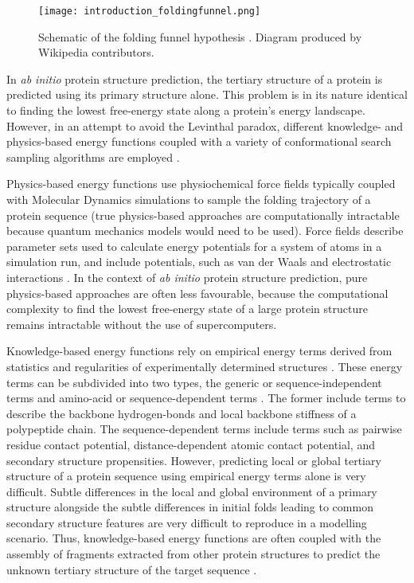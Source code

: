 \begin{figure}[H]
    \centering
    \texttt{[image: introduction\_foldingfunnel.png]}
    \caption[Schematic of the folding funnel hypothesis]{Schematic of the folding funnel hypothesis \cite{Leopold1992-yf}. Diagram produced by Wikipedia contributors.}
    \label{fig:introduction_foldingfunnel}
\end{figure}

In \textit{ab initio} protein structure prediction, the tertiary structure of a protein is predicted using its primary structure alone. This problem is in its nature identical to finding the lowest free-energy state along a protein's energy landscape. However, in an attempt to avoid the Levinthal paradox, different knowledge- and physics-based energy functions coupled with a variety of conformational search sampling algorithms are employed \cite{Lee2017-oc}. 

Physics-based energy functions use physiochemical force fields typically coupled with Molecular Dynamics simulations to sample the folding trajectory of a protein sequence (true physics-based approaches are computationally intractable because quantum mechanics models would need to be used). Force fields describe parameter sets used to calculate energy potentials for a system of atoms in a simulation run, and include potentials, such as van der Waals and electrostatic interactions \cite{Lee2017-oc}. In the context of \textit{ab initio} protein structure prediction, pure physics-based approaches are often less favourable, because the computational complexity to find the lowest free-energy state of a large protein structure remains intractable without the use of supercomputers.

Knowledge-based energy functions rely on empirical energy terms derived from statistics and regularities of experimentally determined structures \cite{Lee2017-oc}. These energy terms can be subdivided into two types, the generic or sequence-independent terms and amino-acid or sequence-dependent terms \cite{Skolnick2006-uv}. The former include terms to describe the backbone hydrogen-bonds and local backbone stiffness of a polypeptide chain. The sequence-dependent terms include terms such as pairwise residue contact potential, distance-dependent atomic contact potential, and secondary structure propensities. However, predicting local or global tertiary structure of a protein sequence using empirical energy terms alone is very difficult. Subtle differences in the local and global environment of a primary structure alongside the subtle differences in initial folds leading to common secondary structure features are very difficult to reproduce in a modelling scenario. Thus, knowledge-based energy functions are often coupled with the assembly of fragments extracted from other protein structures to predict the unknown tertiary structure of the target sequence \cite{Lee2017-oc}. 

